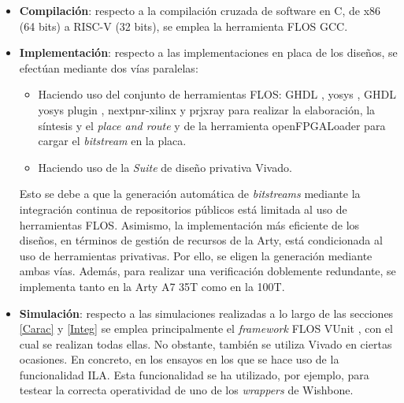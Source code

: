 \begin{itemize}
    \item \textbf{Compilación}: respecto a la compilación cruzada de software en C, de x86 (64 bits) a RISC-V (32 bits), se emplea la herramienta FLOS GCC.
    \item \textbf{Implementación}: respecto a las implementaciones en placa de los diseños, se efectúan mediante dos vías paralelas:
        \begin{itemize}
            \item Haciendo uso del conjunto de herramientas FLOS: GHDL \cite{gh:ghdl}, yosys \cite{gh:yosys}, GHDL yosys plugin \cite{gh:ghdl-plugin}, nextpnr-xilinx \cite{gh:nextpnr} y prjxray \cite{gh:prjxray} para realizar la elaboración, la síntesis y el \textit{place and route} y de la herramienta openFPGALoader \cite{gh:openFPGALoader} para cargar el \textit{bitstream} en la placa.
            \item Haciendo uso de la \textit{Suite} de diseño privativa Vivado.
        \end{itemize}
Esto se debe a que la generación automática de \textit{bitstreams} mediante la integración continua de repositorios públicos está limitada al uso de herramientas FLOS.
Asimismo, la implementación más eficiente de los diseños, en términos de gestión de recursos de la Arty, está condicionada al uso de herramientas privativas.
Por ello, se eligen la generación mediante ambas vías.
Además, para realizar una verificación doblemente redundante, se implementa tanto en la Arty A7 35T como en la 100T.
    \item \textbf{Simulación}: respecto a las simulaciones realizadas a lo largo de las secciones \ref{Carac} y \ref{Integ} se emplea principalmente el \textit{framework} FLOS VUnit \cite{gh:vunit}, con el cual se realizan todas ellas.
No obstante, también se utiliza Vivado en ciertas ocasiones.  
En concreto, en los ensayos en los que se hace uso de la funcionalidad ILA.
Esta funcionalidad se ha utilizado, por ejemplo, para testear la correcta operatividad de uno de los \textit{wrappers} de Wishbone.
\end{itemize} 


